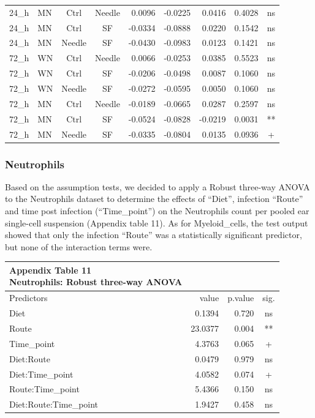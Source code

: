 \documentclass[
  12pt,
  letterpaper,
]{article}
\begin{document}
\begin{longtable}{llccrrrrc}
24\_h & MN & Ctrl & Needle & 0.0096 & -0.0225 & 0.0416 & 0.4028 & ns \\ 
24\_h & MN & Ctrl & SF & -0.0334 & -0.0888 & 0.0220 & 0.1542 & ns \\ 
24\_h & MN & Needle & SF & -0.0430 & -0.0983 & 0.0123 & 0.1421 & ns \\ 
72\_h & WN & Ctrl & Needle & 0.0066 & -0.0253 & 0.0385 & 0.5523 & ns \\ 
72\_h & WN & Ctrl & SF & -0.0206 & -0.0498 & 0.0087 & 0.1060 & ns \\ 
72\_h & WN & Needle & SF & -0.0272 & -0.0595 & 0.0050 & 0.1060 & ns \\ 
72\_h & MN & Ctrl & Needle & -0.0189 & -0.0665 & 0.0287 & 0.2597 & ns \\ 
72\_h & MN & Ctrl & SF & -0.0524 & -0.0828 & -0.0219 & 0.0031 & ** \\ 
72\_h & MN & Needle & SF & -0.0335 & -0.0804 & 0.0135 & 0.0936 & + \\ 
\bottomrule
\end{longtable}
\endgroup

\subsubsection{Neutrophils}\label{neutrophils-1}

Based on the assumption tests, we decided to apply a Robust three-way ANOVA to the Neutrophils dataset to determine the effects of ``Diet'', infection ``Route'' and time post infection (``Time\_point'') on the Neutrophils count per pooled ear single-cell suspension (Appendix table 11). As for Myeloid\_cells, the test output showed that only the infection ``Route'' was a statistically significant predictor, but none of the interaction terms were.

\begingroup
\fontsize{12.0pt}{14.4pt}\selectfont
\begin{longtable}{l|rrc}
\caption*{
{\large \textbf{Appendix Table 11}} \\ 
{\small \textbf{Neutrophils: Robust three-way ANOVA}}
} \\ 
\toprule
Predictors & {value} & {p.value} & {sig.} \\ 
\midrule\addlinespace[2.5pt]
Diet & 0.1394 & 0.720 & ns \\ 
Route & 23.0377 & 0.004 & ** \\ 
Time\_point & 4.3763 & 0.065 & + \\ 
Diet:Route & 0.0479 & 0.979 & ns \\ 
Diet:Time\_point & 4.0582 & 0.074 & + \\ 
Route:Time\_point & 5.4366 & 0.150 & ns \\ 
Diet:Route:Time\_point & 1.9427 & 0.458 & ns \\ 
\bottomrule
\end{longtable}
\endgroup
\end{document}
